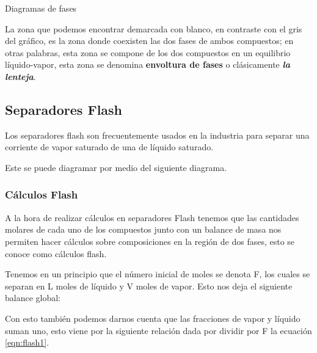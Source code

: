 \begin{images}{Diagramas de fases}
\end{images}

La zona que podemos encontrar demarcada con blanco, en contraste con el gris del gráfico, es la zona donde coexisten las dos fases de ambos compuestos; en otras palabras,
esta zona se compone de los dos compuestos en un equilibrio líquido-vapor, esta zona se denomina \textbf{envoltura de fases} o clásicamente \textit{\textbf{la lenteja}}.

\clearpage
\subsection{Separadores Flash}

Los separadores flash son frecuentemente usados en la industria para separar una corriente de vapor saturado de una de líquido saturado.

Este se puede diagramar por medio del siguiente diagrama.

\subsubsection{Cálculos Flash}
A la hora de realizar cálculos en separadores Flash tenemos que las cantidades molares de cada uno de los compuestos 
junto con un balance de masa nos permiten hacer cálculos sobre composiciones en la región de dos fases, esto se conoce como cálculos flash.

Tenemos en un principio que el número inicial de moles se denota F, los cuales se separan en L moles de líquido y V moles de vapor. Esto nos deja el siguiente balance global:

\insertequation[\label{eqn:flash1}]{F=L+V}{}

Con esto también podemos darnos cuenta que las fracciones de vapor y líquido suman uno, esto viene por la siguiente relación dada por dividir por F la ecuación \ref{eqn:flash1}.


